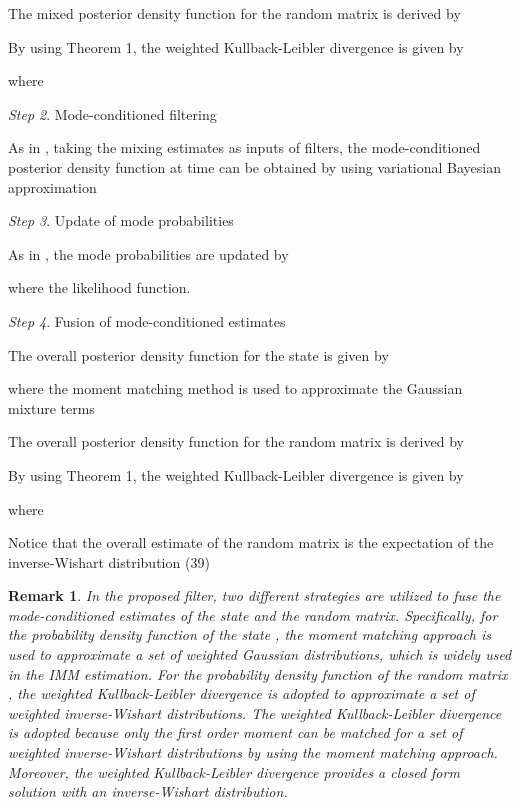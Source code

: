 \documentclass[12pt,draftcls,onecolumn]{IEEEtran}
\newtheorem{remark}{Remark}
\begin{document}
The mixed posterior density function for the random matrix 
is derived by



By using Theorem 1, the weighted Kullback-Leibler divergence is
given by

where




\emph{Step 2}. Mode-conditioned filtering


As in \cite{ourwork2}, taking the mixing estimates as inputs of
filters, the mode-conditioned posterior density function at time 
can be obtained by using variational Bayesian approximation




\emph{Step 3}. Update of mode probabilities


As in \cite{ourwork2}, the mode probabilities are updated by

where  the likelihood function.


\emph{Step 4}. Fusion of mode-conditioned estimates


The overall posterior density function for the state  is
given by

where the moment matching method is used to approximate the Gaussian
mixture terms



The overall posterior density function for the random matrix 
is derived by



By using Theorem 1, the weighted Kullback-Leibler divergence is
given by

where



Notice that the overall estimate of the random matrix is the
expectation of the inverse-Wishart distribution (39)



\begin{remark}
In the proposed filter, two different strategies are utilized to
fuse the mode-conditioned estimates of the state and the random
matrix. Specifically, for the probability density function of the
state , the moment matching approach is used to approximate a
set of weighted Gaussian distributions, which is widely used in the
IMM estimation. For the probability density function of the random
matrix , the weighted Kullback-Leibler divergence is adopted to
approximate a set of weighted inverse-Wishart distributions. The
weighted Kullback-Leibler divergence is adopted because only the
first order moment can be matched for a set of weighted
inverse-Wishart distributions by using the moment matching approach.
Moreover, the weighted Kullback-Leibler divergence provides a closed
form solution with an inverse-Wishart distribution.
\end{remark}
\end{document}
